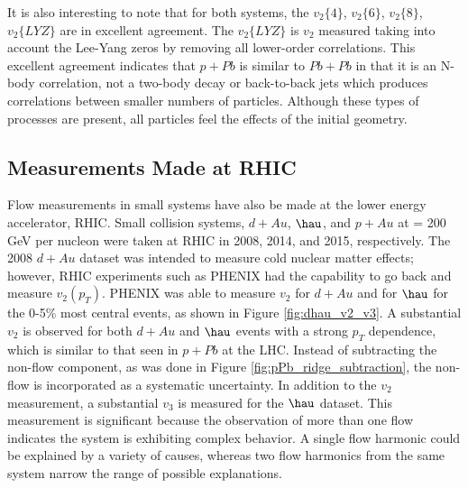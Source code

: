 It is also interesting to note that for both systems, the $v_2\{4\}$, $v_2\{6\}$, $v_2\{8\}$, $v_2\{LYZ\}$ are in excellent agreement. The $v_2\{LYZ\}$ is $v_2$ measured taking into account the Lee-Yang zeros by removing all lower-order correlations. This excellent agreement indicates that $p+Pb$ is similar to $Pb+Pb$ in that it is an N-body correlation, not a two-body decay or back-to-back jets which produces correlations between smaller numbers of particles. Although these types of processes are present, all particles feel the effects of the initial geometry.

\subsection{Measurements Made at RHIC}

Flow measurements in small systems have also be made at the lower energy accelerator, RHIC. Small collision systems, $d+Au$, $\hau$, and $p+Au$ at \sqsn = 200 GeV per nucleon were taken at RHIC in 2008, 2014, and 2015, respectively. The 2008 $d+Au$ dataset was intended to measure cold nuclear matter effects; however, RHIC experiments such as PHENIX had the capability to go back and measure $v_2(p_T)$. PHENIX was able to measure $v_2$ for $d+Au$ and for $\hau$ for the 0-5\% most central events, as shown in Figure \ref{fig:dhau_v2_v3}. A substantial $v_2$ is observed for both $d+Au$ and $\hau$ events with a strong $p_T$ dependence, which is similar to that seen in $p+Pb$ at the LHC. Instead of subtracting the non-flow component, as was done in Figure \ref{fig:pPb_ridge_subtraction}, the non-flow is incorporated as a systematic uncertainty. In addition to the $v_2$ measurement, a substantial $v_3$ is measured for the $\hau$ dataset. This measurement is significant because the observation of more than one flow indicates the system is exhibiting complex behavior. A single flow harmonic could be explained by a variety of causes, whereas two flow harmonics from the same system narrow the range of possible explanations.


